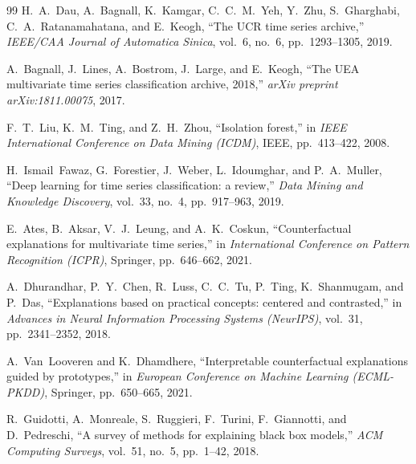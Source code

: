 \documentclass[11pt,a4paper]{report}
\begin{document}
\begin{thebibliography}{99}
H.~A.~Dau, A.~Bagnall, K.~Kamgar, C.~C.~M.~Yeh, Y.~Zhu, S.~Gharghabi, C.~A.~Ratanamahatana, and E.~Keogh, ``The UCR time series archive,'' \emph{IEEE/CAA Journal of Automatica Sinica}, vol.~6, no.~6, pp.~1293--1305, 2019.

A.~Bagnall, J.~Lines, A.~Bostrom, J.~Large, and E.~Keogh, ``The UEA multivariate time series classification archive, 2018,'' \emph{arXiv preprint arXiv:1811.00075}, 2017.

F.~T.~Liu, K.~M.~Ting, and Z.~H.~Zhou, ``Isolation forest,'' in \emph{IEEE International Conference on Data Mining (ICDM)}, IEEE, pp.~413--422, 2008.

H.~Ismail~Fawaz, G.~Forestier, J.~Weber, L.~Idoumghar, and P.~A.~Muller, ``Deep learning for time series classification: a review,'' \emph{Data Mining and Knowledge Discovery}, vol.~33, no.~4, pp.~917--963, 2019.

E.~Ates, B.~Aksar, V.~J.~Leung, and A.~K.~Coskun, ``Counterfactual explanations for multivariate time series,'' in \emph{International Conference on Pattern Recognition (ICPR)}, Springer, pp.~646--662, 2021.

A.~Dhurandhar, P.~Y.~Chen, R.~Luss, C.~C.~Tu, P.~Ting, K.~Shanmugam, and P.~Das, ``Explanations based on practical concepts: centered and contrasted,'' in \emph{Advances in Neural Information Processing Systems (NeurIPS)}, vol.~31, pp.~2341--2352, 2018.

A.~Van~Looveren and K.~Dhamdhere, ``Interpretable counterfactual explanations guided by prototypes,'' in \emph{European Conference on Machine Learning (ECML-PKDD)}, Springer, pp.~650--665, 2021.

R.~Guidotti, A.~Monreale, S.~Ruggieri, F.~Turini, F.~Giannotti, and D.~Pedreschi, ``A survey of methods for explaining black box models,'' \emph{ACM Computing Surveys}, vol.~51, no.~5, pp.~1--42, 2018.

\end{thebibliography}
\end{document}
